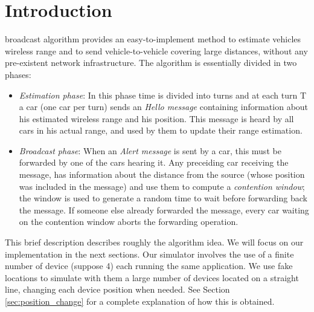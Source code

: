\section{Introduction}
% 
% 
% 
% 
 broadcast algorithm provides an easy-to-implement method to estimate vehicles wireless range and to send vehicle-to-vehicle covering large distances, without any pre-existent network infrastructure. The algorithm is essentially divided in two phases:
	\begin{itemize}
		\item \emph{Estimation phase}: In this phase time is divided into turns and at each turn T a car (one car per turn) sends an \emph{Hello message} containing information about his estimated wireless range and his position. This message is heard by all cars in his actual range, and used by them to update their range estimation.
		\item \emph{Broadcast phase}: When an \emph{Alert message} is sent by a car, this must be forwarded by one of the cars hearing it. Any preceiding car receiving the message, has information about the distance from the source (whose position was included in the message) and use them to compute a \emph{contention window}; the window is used to generate a random time to wait before forwarding back the message.
		If someone else already forwarded the message, every car waiting on the contention window aborts the forwarding operation.
	\end{itemize} 
	
This brief description describes roughly the algorithm idea. We will focus on our implementation in the next sections.
Our simulator involves the use of a finite number of device (suppose 4) each running the same application. We use fake locations to simulate with them a large number of devices located on a straight line, changing each device position when needed. See Section \ref{sec:position_change} for a complete explanation of how this is obtained.
